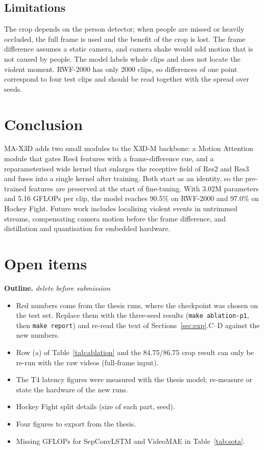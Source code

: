 \documentclass[conference]{IEEEtran}
\newenvironment{outline}[1]
  {\par\medskip\noindent\color{outlinegray}\small
   \textbf{Outline.} \textit{#1}\begin{itemize}\setlength{\itemsep}{2pt}}
  {\end{itemize}\par\medskip}
\newif\ifdraft \drafttrue
\newcommand{\res}[1]{\ifdraft{\color{red}#1}\else#1\fi}
\begin{document}
\subsection{Limitations}

The crop depends on the person detector; when people are missed or
heavily occluded, the full frame is used and the benefit of the crop is
lost. The frame difference assumes a static camera, and camera shake
would add motion that is not caused by people. The model labels whole
clips and does not locate the violent moment. RWF-2000 has only 2000
clips, so differences of one point correspond to four test clips and
should be read together with the spread over seeds.

\section{Conclusion}
\label{sec:conclusion}

MA-X3D adds two small modules to the X3D-M backbone: a Motion Attention
module that gates Res4 features with a frame-difference cue, and a
reparameterised wide kernel that enlarges the receptive field of Res2 and
Res3 and fuses into a single kernel after training. Both start as an
identity, so the pre-trained features are preserved at the start of
fine-tuning. With 3.02M parameters and 5.16 GFLOPs per clip, the model
reaches \res{90.5\%} on RWF-2000 and \res{97.0\%} on Hockey Fight.
Future work includes localising violent events in untrimmed streams,
compensating camera motion before the frame difference, and
distillation and quantisation for embedded hardware.

\section*{Open items}

\begin{outline}{delete before submission}
  \item Red numbers come from the thesis runs, where the checkpoint was
        chosen on the test set. Replace them with the three-seed results
        (\texttt{make ablation-p1}, then \texttt{make report}) and re-read
        the text of Sections~\ref{sec:exp}.C--D against the new numbers.
  \item Row (a) of Table~\ref{tab:ablation} and the 84.75/86.75 crop
        result can only be re-run with the raw videos (full-frame input).
  \item The T4 latency figures were measured with the thesis model;
        re-measure or state the hardware of the new runs.
  \item Hockey Fight split details (size of each part, seed).
  \item Four figures to export from the thesis.
  \item Missing GFLOPs for SepConvLSTM and VideoMAE in Table~\ref{tab:sota}.
\end{outline}



\end{document}
